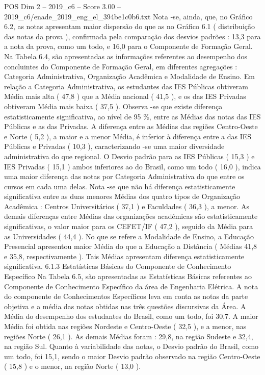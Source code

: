 \begin{textsample}{POS Dim 2 – 2019\_c6 – Score 3.00 – 2019\_c6/enade\_2019\_eng\_el\_394be1c0b6.txt}
Nota -se, ainda, que, no Gráfico 6.2, as notas apresentam maior dispersão do que as no Gráfico 6.1 ( distribuição das notas da prova ), confirmada pela comparação dos desvios padrões : 13,3 para a nota da prova, como um todo, e 16,0 para o Componente de Formação Geral.
Na Tabela 6.4, são apresentadas as informações referentes ao desempenho dos concluintes do Componente de Formação Geral, em diferentes agregações : Categoria Administrativa, Organização Acadêmica e Modalidade de Ensino.
Em relação a Categoria Administrativa, os estudantes das IES Públicas obtiveram Média mais alta ( 47,8 ) que a Média nacional ( 41,5 ), e os das IES Privadas obtiveram Média mais baixa ( 37,5 ).
Observa -se que existe diferença estatisticamente significativa, ao nível de 95 \%, entre as Médias das notas das IES Públicas e as das Privadas.
A diferença entre as Médias das regiões Centro-Oeste e Norte ( 5,2 ), a maior e a menor Média, é inferior à diferença entre a das IES Públicas e Privadas ( 10,3 ), caracterizando -se uma maior diversidade administrativa do que regional.
O Desvio padrão para as IES Públicas ( 15,3 ) e IES Privadas ( 15,1 ) ambos inferiores ao do Brasil, como um todo ( 16,0 ), indica uma maior diferença das notas por Categoria Administrativa do que entre os cursos em cada uma delas.
Nota -se que não há diferença estatisticamente significativa entre as duas menores Médias dos quatro tipos de Organização Acadêmica : Centros Universitários ( 37,1 ) e Faculdades ( 36,3 ), a menor.
As demais diferenças entre Médias das organizações acadêmicas são estatisticamente significativas, o valor maior para os CEFET/IF ( 47,2 ), seguido da Média para as Universidades ( 44,4 ).
No que se refere a Modalidade de Ensino, a Educação Presencial apresentou maior Média do que a Educação a Distância ( Médias 41,8 e 35,8, respectivamente ).
Tais Médias apresentam diferença estatisticamente significativa. 6.1.3 Estatísticas Básicas do Componente de Conhecimento Específico Na Tabela 6.5, são apresentadas as Estatísticas Básicas referentes ao Componente de Conhecimento Específico da área de Engenharia Elétrica.
A nota do componente de Conhecimentos Específicos leva em conta as notas da parte objetiva e a média das notas obtidas nas três questões discursivas da Área.
A Média do desempenho dos estudantes do Brasil, como um todo, foi 30,7.
A maior Média foi obtida nas regiões Nordeste e Centro-Oeste ( 32,5 ), e a menor, nas regiões Norte ( 26,1 ).
As demais Médias foram : 29,8, na região Sudeste e 32,4, na região Sul.
Quanto à variabilidade das notas, o Desvio padrão do Brasil, como um todo, foi 15,1, sendo o maior Desvio padrão observado na região Centro-Oeste ( 15,8 ) e o menor, na região Norte ( 13,0 ).

\end{textsample}
